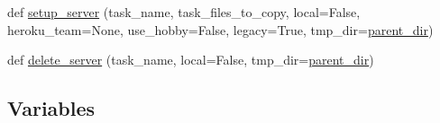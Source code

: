 \begin{DoxyCompactItemize}
\item 
def \hyperlink{namespaceparlai_1_1mturk_1_1core_1_1server__utils_a154e8cbb18375ff8fd6730154d312bbc}{setup\+\_\+server} (task\+\_\+name, task\+\_\+files\+\_\+to\+\_\+copy, local=False, heroku\+\_\+team=None, use\+\_\+hobby=False, legacy=True, tmp\+\_\+dir=\hyperlink{namespaceparlai_1_1mturk_1_1core_1_1server__utils_a193439bdbc25a32b00f1a43e6f8532d8}{parent\+\_\+dir})
\item 
def \hyperlink{namespaceparlai_1_1mturk_1_1core_1_1server__utils_a3c7c1d82bd4d26eb98ce9711de3cca7c}{delete\+\_\+server} (task\+\_\+name, local=False, tmp\+\_\+dir=\hyperlink{namespaceparlai_1_1mturk_1_1core_1_1server__utils_a193439bdbc25a32b00f1a43e6f8532d8}{parent\+\_\+dir})
\end{DoxyCompactItemize}
\subsection*{Variables}
